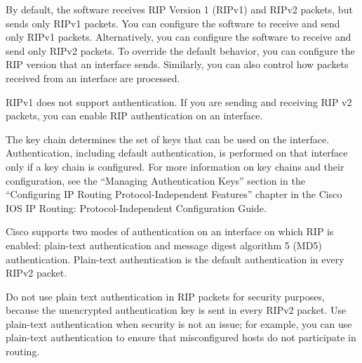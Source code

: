 \documentclass[../EngineeringJournal_CDavis.tex]{subfiles}
\begin{document}
\hspace{0.2cm}
\begin{tcolorbox}[width=6.3in]
\scriptsize
By default, the software receives RIP Version 1 (RIPv1) and RIPv2 packets, but sends only RIPv1 packets. You can configure the software to receive and send only RIPv1 packets. Alternatively, you can configure the software to receive and send only RIPv2 packets. To override the default behavior, you can configure the RIP version that an interface sends. Similarly, you can also control how packets received from an interface are processed.
\end{tcolorbox}
\hspace{0.2cm}
\normalsize  

\hspace{0.2cm}
\begin{tcolorbox}[width=6.3in]
RIPv1 does not support authentication. If you are sending and receiving RIP v2 packets, you can enable RIP authentication on an interface.
\end{tcolorbox}
\hspace{0.2cm}

\hspace{0.2cm}
\begin{tcolorbox}[width=6.3in]
\scriptsize
The key chain determines the set of keys that can be used on the interface. Authentication, including default authentication, is performed on that interface only if a key chain is configured. For more information on key chains and their configuration, see the “Managing Authentication Keys” section in the “Configuring IP Routing Protocol-Independent Features” chapter in the Cisco IOS IP Routing: Protocol-Independent Configuration Guide.
\end{tcolorbox}
\hspace{0.2cm}
\normalsize  

\hspace{0.2cm}
\begin{tcolorbox}[width=6.3in]
\scriptsize
Cisco supports two modes of authentication on an interface on which RIP is enabled: plain-text authentication and message digest algorithm 5 (MD5) authentication. Plain-text authentication is the default authentication in every RIPv2 packet.
\end{tcolorbox}
\hspace{0.2cm}
\normalsize  


\hspace{0.2cm}
\begin{tcolorbox}[width=6.3in]
\scriptsize
Do not use plain text authentication in RIP packets for security purposes, because the unencrypted authentication key is sent in every RIPv2 packet. Use plain-text authentication when security is not an issue; for example, you can use plain-text authentication to ensure that misconfigured hosts do not participate in routing.
\end{tcolorbox}
\hspace{0.2cm}
\normalsize  
\end{document}
